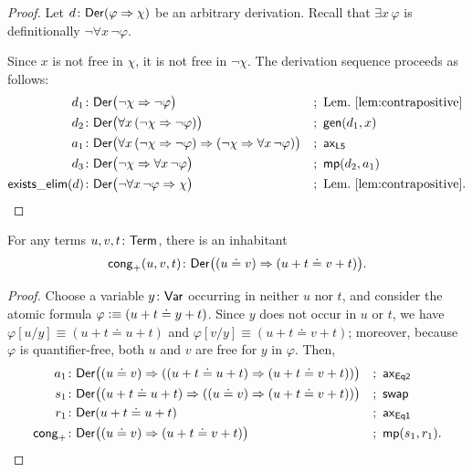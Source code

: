 \begin{proof}
    Let $d\colon\fun{Der}(\varphi \imp \chi)$ be an arbitrary derivation. Recall that $\exists x\,\varphi$ is definitionally $\neg\forall x\,\neg\varphi$.
    
    Since $x$ is not free in $\chi$, it is not free in $\neg\chi$. The derivation sequence proceeds as follows:
    \begin{align*}
        d_1&\colon\fun{Der}\bigl(
            \neg\chi \imp \neg\varphi
        \bigr)
            &&;\ \text{Lem.~\ref{lem:contrapositive}}\\
        d_2&\colon\fun{Der}\bigl(
            \forall x\,(\neg\chi\imp\neg\varphi)
        \bigr)
            &&;\ \fun{gen}(d_1, x)\\
        a_1&\colon\fun{Der}\bigl(
            \forall x\,(\neg\chi\imp\neg\varphi)
            \imp
            (\neg\chi\imp\forall x\,\neg\varphi)
        \bigr)
            &&;\ \fun{ax}_{\fun{L5}}\\
        d_3&\colon\fun{Der}\bigl(
            \neg\chi\imp\forall x\,\neg\varphi
        \bigr)
            &&;\ \fun{mp}(d_2,a_1)\\
        \fun{exists\_elim}(d)&\colon\fun{Der}\bigl(
            \neg\forall x\,\neg\varphi\imp\chi
        \bigr)
            &&;\ \text{Lem.~\ref{lem:contrapositive}}.
    \end{align*}
\end{proof}

\begin{lem}
    \label{lem:cong-add}
    For any terms\/ $u,v,t\colon\fun{Term}$, there is an inhabitant
    \[
        \fun{cong}_+(u,v,t)\colon\fun{Der}\bigl(
            (u\doteq v)\imp(u+t\doteq v+t)
        \bigr).
    \]
\end{lem}

\begin{proof}
    Choose a variable $y\colon\fun{Var}$ occurring in neither $u$ nor $t$, and consider the atomic formula $\varphi\mathrel{\vcentcolon}\equiv(u+t\doteq y+t)$. Since $y$ does not occur in $u$ or $t$, we have $\varphi[u/y]\equiv(u+t\doteq u+t)$ and $\varphi[v/y]\equiv(u+t\doteq v+t)$; moreover, because $\varphi$ is quantifier-free, both $u$ and $v$ are free for $y$ in $\varphi$. Then,
    \begin{align*}
        a_1&\colon\fun{Der}\bigl(
            (u\doteq v)
            \imp
            ((u+t\doteq u+t)\imp(u+t\doteq v+t))
        \bigr)
            &&;\ \fun{ax}_{\fun{Eq2}}\\
        s_1&\colon\fun{Der}\bigl(
            (u+t\doteq u+t)
            \imp
            ((u\doteq v)\imp(u+t\doteq v+t))
        \bigr)
            &&;\ \fun{swap}\\
        r_1&\colon\fun{Der}(u+t\doteq u+t)
            &&;\ \fun{ax}_{\fun{Eq1}}\\
        \fun{cong}_+&\colon\fun{Der}\bigl(
            (u\doteq v)\imp(u+t\doteq v+t)
        \bigr)
            &&;\ \fun{mp}(s_1,r_1).
    \end{align*}
\end{proof}

